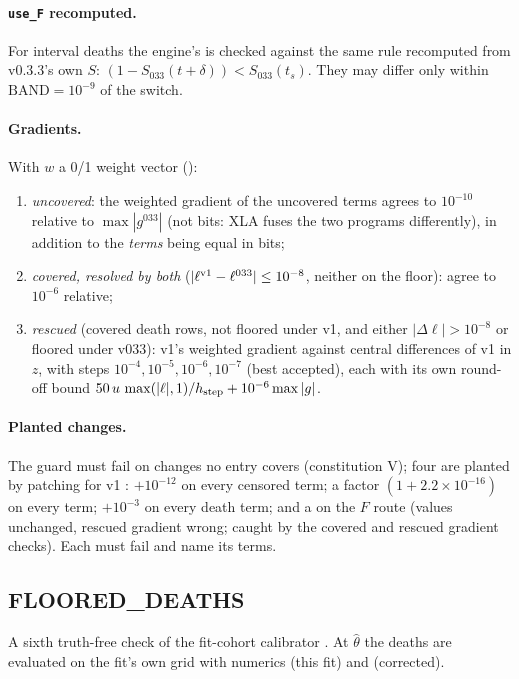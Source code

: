 \paragraph{\texttt{use\_F} recomputed.} For interval deaths the engine's  is checked against the same rule
recomputed from v0.3.3's own $S$: $(1-S_{033}(t+\delta))<S_{033}(t_s)$. They may differ only within $\mathrm{BAND}=10^{-9}$
of the switch.

\paragraph{Gradients.} With $w$ a 0/1 weight vector ():
\begin{enumerate}[nosep]
  \item \emph{uncovered}: the weighted gradient of the uncovered terms agrees to $10^{-10}$ relative to
    $\max|g^{033}|$ (not bits: XLA fuses the two programs differently), in addition to the \emph{terms} being equal in bits;
  \item \emph{covered, resolved by both} ($|\ell^{\rm v1}-\ell^{033}|\le10^{-8}$, neither on the floor): agree to $10^{-6}$ relative;
  \item \emph{rescued} (covered death rows, not floored under v1, and either $|\Delta\ell|>10^{-8}$ or floored under v033): v1's
    weighted gradient against central differences of v1 in $z$, with steps $10^{-4},10^{-5},10^{-6},10^{-7}$ (best accepted), each
    with its own round-off bound $50\,u\,\max(|\ell|,1)/h_{\rm step}+10^{-6}\max|g|$.
\end{enumerate}
\paragraph{Planted changes.} The guard must fail on changes no entry covers (constitution V); four are planted by
patching  for v1 : $+10^{-12}$ on every censored term;
a factor $(1+2.2\times10^{-16})$ on every term; $+10^{-3}$ on every death term; and a  on the $F$ route
(values unchanged, rescued gradient wrong; caught by the covered and rescued gradient checks). Each must fail and name its
terms.

\subsection{FLOORED\_DEATHS}\label{sec:fp-floors}

A sixth truth-free check of the fit-cohort calibrator . At $\hat\theta$ the deaths are
evaluated on the fit's own grid with numerics  (this fit) and  (corrected).
